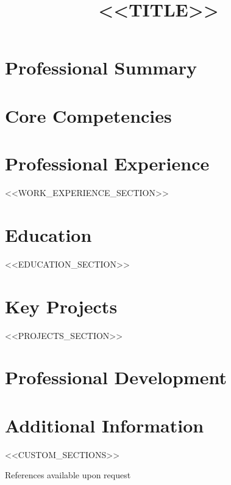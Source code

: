 \documentclass[11pt,a4paper,roman]{moderncv}
\title{<<TITLE>>}
\begin{document}
\makecvtitle

\section{Professional Summary}

\section{Core Competencies}

\section{Professional Experience}
<<WORK_EXPERIENCE_SECTION>>

\section{Education}
<<EDUCATION_SECTION>>

\section{Key Projects}
<<PROJECTS_SECTION>>

\section{Professional Development}

\section{Additional Information}

<<CUSTOM_SECTIONS>>

\vfill
\begin{center}
\textcolor{mediumgray}{\footnotesize References available upon request}
\end{center}
\end{document}
